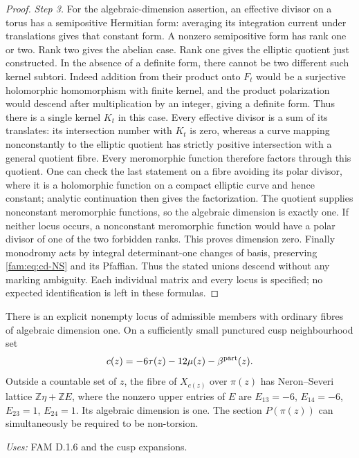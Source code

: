 \begin{proof}
\par\noindent\textit{Step 3.} For the algebraic-dimension assertion, an effective divisor on a torus
has a semipositive Hermitian form: averaging its integration current under
translations gives that constant form. A nonzero semipositive form has
rank one or two. Rank two gives the abelian case. Rank one gives the
elliptic quotient just constructed. In the absence of a definite form,
there cannot be two different such kernel subtori. Indeed addition from
their product onto $F_t$ would be a surjective holomorphic homomorphism
with finite kernel, and the product polarization would descend after
multiplication by an integer, giving a definite form. Thus there is a
single kernel $K_t$ in this case. Every effective divisor is a sum of
its translates: its intersection number with $K_t$ is zero, whereas a
curve mapping nonconstantly to the elliptic quotient has strictly positive
intersection with a general quotient fibre. Every meromorphic function
therefore factors through this quotient. One can check the last statement
on a fibre avoiding its polar divisor, where it is a holomorphic function
on a compact elliptic curve and hence constant; analytic continuation
then gives the factorization. The quotient supplies nonconstant
meromorphic functions, so the algebraic dimension is exactly one.
If neither locus occurs, a nonconstant meromorphic function would have
a polar divisor of one of the two forbidden ranks. This proves dimension
zero. Finally monodromy acts by integral determinant-one changes of basis,
preserving \eqref{fam:eq:cd-NS} and its Pfaffian. Thus the stated unions descend
without any marking ambiguity. Each individual matrix and every locus
is specified; no expected identification is left in these formulas.
\end{proof}

\begin{proposition}[FAM D.1.7; T]\label{fam:D.1.7}
There is an explicit nonempty locus of admissible members with ordinary
fibres of algebraic dimension one. On a sufficiently small punctured
cusp neighbourhood set
\[
 c(z)=-6\tau(z)-12\mu(z)-\beta^{\rm part}(z).
\]
Outside a countable set of $z$, the fibre of $X_{c(z)}$ over $\pi(z)$ has
Neron--Severi lattice $\mathbb Z\eta+\mathbb ZE$, where the nonzero upper
entries of $E$ are
$E_{13}=-6$, $E_{14}=-6$, $E_{23}=1$, $E_{24}=1$.
Its algebraic dimension is one. The section $P(\pi(z))$ can simultaneously
be required to be non-torsion.
\end{proposition}
\noindent\emph{Uses:} FAM D.1.6 and the cusp expansions.\par

